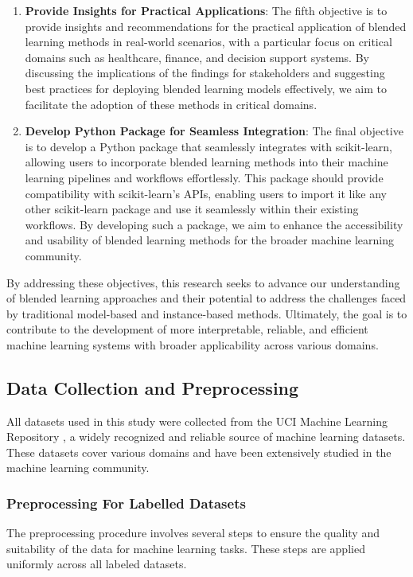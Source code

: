 \documentclass[a4paper, 12pt]{report}
\begin{document}
\begin{enumerate}
    \item \textbf{Provide Insights for Practical Applications}: 
    The fifth objective is to provide insights and recommendations for the practical application of blended learning methods in real-world scenarios, with a particular focus on critical domains such as healthcare, 
    finance, and decision support systems. By discussing the implications of the findings for stakeholders and suggesting best practices for deploying blended learning models effectively, 
    we aim to facilitate the adoption of these methods in critical domains.

    \item \textbf{Develop Python Package for Seamless Integration}: 
    The final objective is to develop a Python package that seamlessly integrates with scikit-learn, allowing users to incorporate blended learning methods into their machine learning pipelines and workflows effortlessly. 
    This package should provide compatibility with scikit-learn's APIs, enabling users to import it like any other scikit-learn package and use it seamlessly within their existing workflows. 
    By developing such a package, we aim to enhance the accessibility and usability of blended learning methods for the broader machine learning community.
\end{enumerate}

By addressing these objectives, this research seeks to advance our understanding of blended learning approaches and their potential to address the challenges faced by 
traditional model-based and instance-based methods. Ultimately, the goal is to contribute to the development of more interpretable, reliable, and efficient machine learning 
systems with broader applicability across various domains.

\subsection{Data Collection and Preprocessing}
All datasets used in this study were collected from the UCI Machine Learning Repository \cite{uciRepository}, a widely recognized and reliable source of machine learning datasets. 
These datasets cover various domains and have been extensively studied in the machine learning community.

\subsubsection{Preprocessing For Labelled Datasets}
The preprocessing procedure involves several steps to ensure the quality and suitability of the data for machine learning tasks. These steps are applied uniformly across all labeled datasets.
\end{document}
